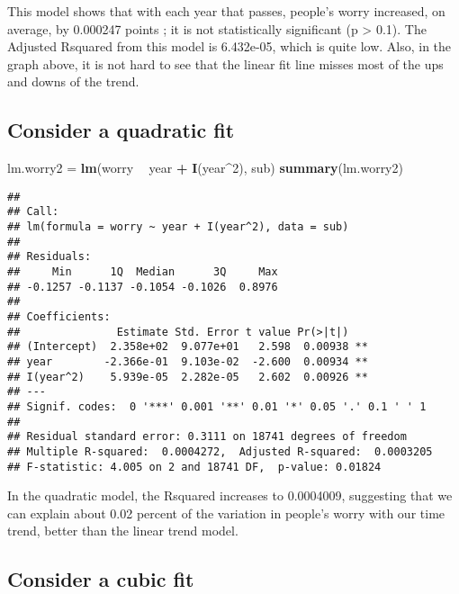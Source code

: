 \documentclass[]{article}
\newenvironment{Shaded}{\begin{snugshade}}{\end{snugshade}}
\newcommand{\DecValTok}[1]{\textcolor[rgb]{0.00,0.00,0.81}{#1}}
\newcommand{\KeywordTok}[1]{\textcolor[rgb]{0.13,0.29,0.53}{\textbf{#1}}}
\newcommand{\NormalTok}[1]{#1}
\newcommand{\OperatorTok}[1]{\textcolor[rgb]{0.81,0.36,0.00}{\textbf{#1}}}
\newcommand{\StringTok}[1]{\textcolor[rgb]{0.31,0.60,0.02}{#1}}
\begin{document}
This model shows that with each year that passes, people's worry
increased, on average, by 0.000247 points ; it is not statistically
significant (p \textgreater{} 0.1). The Adjusted Rsquared from this
model is 6.432e-05, which is quite low. Also, in the graph above, it is
not hard to see that the linear fit line misses most of the ups and
downs of the trend.

\hypertarget{consider-a-quadratic-fit}{%
\subsection{Consider a quadratic fit}\label{consider-a-quadratic-fit}}

\begin{Shaded}
\begin{Highlighting}[]
\NormalTok{lm.worry2 =}\StringTok{ }\KeywordTok{lm}\NormalTok{(worry }\OperatorTok{~}\StringTok{ }\NormalTok{year }\OperatorTok{+}\StringTok{ }\KeywordTok{I}\NormalTok{(year}\OperatorTok{^}\DecValTok{2}\NormalTok{), sub)}
\KeywordTok{summary}\NormalTok{(lm.worry2)}
\end{Highlighting}
\end{Shaded}

\begin{verbatim}
## 
## Call:
## lm(formula = worry ~ year + I(year^2), data = sub)
## 
## Residuals:
##     Min      1Q  Median      3Q     Max 
## -0.1257 -0.1137 -0.1054 -0.1026  0.8976 
## 
## Coefficients:
##               Estimate Std. Error t value Pr(>|t|)   
## (Intercept)  2.358e+02  9.077e+01   2.598  0.00938 **
## year        -2.366e-01  9.103e-02  -2.600  0.00934 **
## I(year^2)    5.939e-05  2.282e-05   2.602  0.00926 **
## ---
## Signif. codes:  0 '***' 0.001 '**' 0.01 '*' 0.05 '.' 0.1 ' ' 1
## 
## Residual standard error: 0.3111 on 18741 degrees of freedom
## Multiple R-squared:  0.0004272,  Adjusted R-squared:  0.0003205 
## F-statistic: 4.005 on 2 and 18741 DF,  p-value: 0.01824
\end{verbatim}

In the quadratic model, the Rsquared increases to 0.0004009, suggesting
that we can explain about 0.02 percent of the variation in people's
worry with our time trend, better than the linear trend model.

\hypertarget{consider-a-cubic-fit}{%
\subsection{Consider a cubic fit}\label{consider-a-cubic-fit}}
\end{document}
